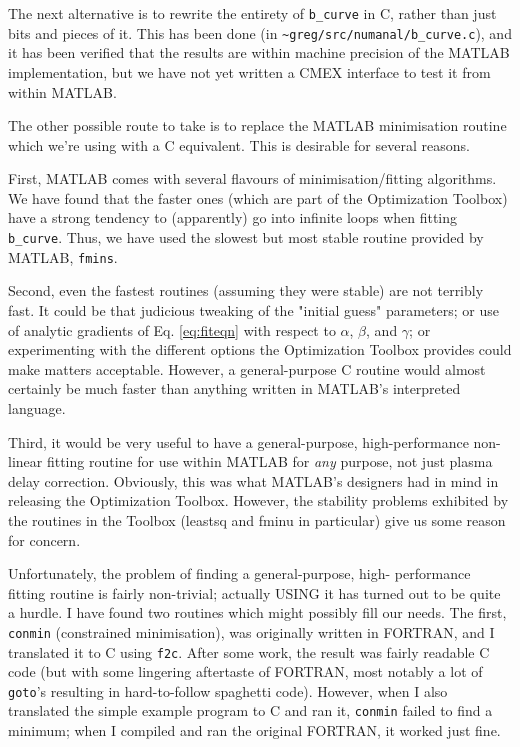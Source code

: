 The next alternative is to rewrite the entirety of \verb|b_curve| in
C, rather than just bits and pieces of it.  This has been done (in
\verb|~greg/src/numanal/b_curve.c|), and it has been verified that the
results are within machine precision of the MATLAB implementation, but
we have not yet written a CMEX interface to test it from within MATLAB.

The other possible route to take is to replace the MATLAB minimisation
routine which we're using with a C equivalent.  This is desirable for
several reasons.

First, MATLAB comes with several flavours of minimisation/fitting
algorithms.  We have found that the faster ones (which are part of the
Optimization Toolbox) have a strong tendency to (apparently) go into
infinite loops when fitting \verb|b_curve|.  Thus, we have used the
slowest but most stable routine provided by MATLAB, \verb|fmins|.

Second, even the fastest routines (assuming they were stable) are not
terribly fast.  It could be that judicious tweaking of the "initial
guess" parameters; or use of analytic gradients of Eq. \ref{eq:fiteqn}
with respect to $\alpha$, $\beta$, and $\gamma$; or experimenting with
the different options the Optimization Toolbox provides could make
matters acceptable.  However, a general-purpose C routine would almost
certainly be much faster than anything written in MATLAB's interpreted
language.

Third, it would be very useful to have a general-purpose,
high-performance non-linear fitting routine for use within MATLAB for
{\em any} purpose, not just plasma delay correction.  Obviously, this
was what MATLAB's designers had in mind in releasing the Optimization
Toolbox.  However, the stability problems exhibited by the routines in
the Toolbox (leastsq and fminu in particular) give us some reason for
concern.

Unfortunately, the problem of finding a general-purpose, high-
performance fitting routine is fairly non-trivial; actually USING it
has turned out to be quite a hurdle.  I have found two routines which
might possibly fill our needs.  The first, \verb|conmin| (constrained
minimisation), was originally written in FORTRAN, and I translated it
to C using \verb|f2c|.  After some work, the result was fairly
readable C code (but with some lingering aftertaste of FORTRAN, most
notably a lot of \verb|goto|'s resulting in hard-to-follow spaghetti
code).  However, when I also translated the simple example program to
C and ran it, \verb|conmin| failed to find a minimum; when I compiled
and ran the original FORTRAN, it worked just fine.

